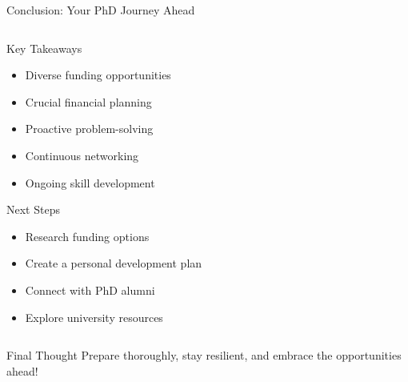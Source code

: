 \documentclass[10pt]{beamer}
\begin{document}
\begin{frame}[fragile]{Conclusion: Your PhD Journey Ahead}
\begin{columns}[T]
    \begin{column}{0.6\textwidth}
        \alert{Key Takeaways}
        \begin{itemize}
            \item Diverse funding opportunities
            \item Crucial financial planning
            \item Proactive problem-solving
            \item Continuous networking
            \item Ongoing skill development
        \end{itemize}
        
        \alert{Next Steps}
        \begin{itemize}
            \item Research funding options
            \item Create a personal development plan
            \item Connect with PhD alumni
            \item Explore university resources
        \end{itemize}
    \end{column}
    \begin{column}{0.4\textwidth}
    \end{column}
\end{columns}

\vspace{0.5cm}
\centering
\alert{Final Thought}
\Large{Prepare thoroughly, stay resilient, and embrace the opportunities ahead!}
\end{frame}
\end{document}
